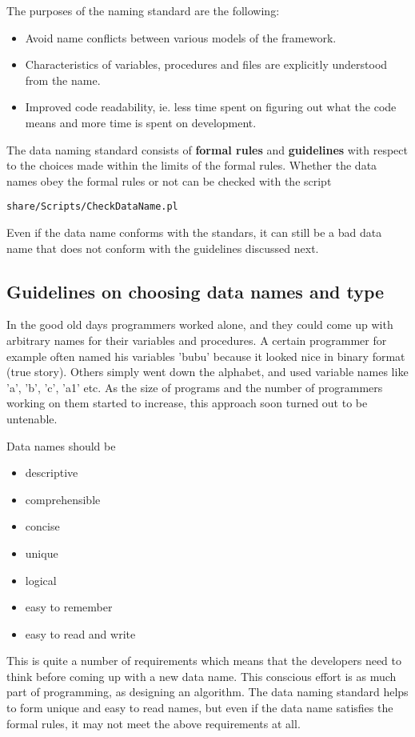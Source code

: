 \documentclass{article}
\begin{document}
The purposes of the naming standard are the following:
\begin{itemize}
\item Avoid name conflicts between various models of the framework.
\item Characteristics of variables, procedures and files are
      explicitly understood from the name.
\item Improved code readability, ie. less time spent on figuring out 
      what the code means and more time is spent on development.
\end{itemize}

The data naming standard consists of {\bf formal rules} and 
{\bf guidelines} with respect to the choices made within 
the limits of the formal rules.
Whether the data names obey the formal rules or not can be checked
with the script
\begin{verbatim}
share/Scripts/CheckDataName.pl
\end{verbatim}
Even if the data name conforms with the standars, it can still be a bad
data name that does not conform with the guidelines discussed next.

\subsection{Guidelines on choosing data names and type}

In the good old days programmers worked alone, and they could come up
with arbitrary names for their variables and procedures. A certain programmer
for example often named his variables 'bubu' because it looked nice in
binary format (true story). Others simply went down the alphabet, and
used variable names like 'a', 'b', 'c', 'a1' etc. As the size of programs 
and the number of programmers working on them started to increase, this
approach soon turned out to be untenable.

Data names should be
\begin{itemize}
\item descriptive
\item comprehensible
\item concise
\item unique
\item logical
\item easy to remember
\item easy to read and write
\end{itemize}
This is quite a number of requirements which means that the developers need
to think before coming up with a new data name. This conscious effort is 
as much part of programming, as designing an algorithm. The data naming
standard helps to form unique and easy to read names, but even if the 
data name satisfies the formal rules, it may not meet the above 
requirements at all.
\end{document}

